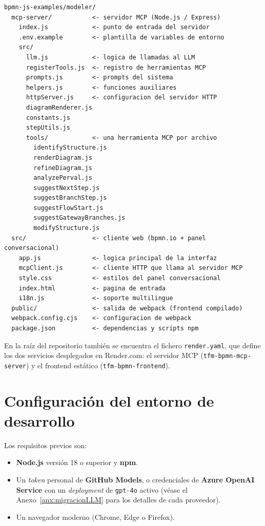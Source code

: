 \begin{lstlisting}[style=promptbox]
bpmn-js-examples/modeler/
  mcp-server/           <- servidor MCP (Node.js / Express)
    index.js            <- punto de entrada del servidor
    .env.example        <- plantilla de variables de entorno
    src/
      llm.js            <- logica de llamadas al LLM
      registerTools.js  <- registro de herramientas MCP
      prompts.js        <- prompts del sistema
      helpers.js        <- funciones auxiliares
      httpServer.js     <- configuracion del servidor HTTP
      diagramRenderer.js
      constants.js
      stepUtils.js
      tools/            <- una herramienta MCP por archivo
        identifyStructure.js
        renderDiagram.js
        refineDiagram.js
        analyzePerval.js
        suggestNextStep.js
        suggestBranchStep.js
        suggestFlowStart.js
        suggestGatewayBranches.js
        modifyStructure.js
  src/                  <- cliente web (bpmn.io + panel conversacional)
    app.js              <- logica principal de la interfaz
    mcpClient.js        <- cliente HTTP que llama al servidor MCP
    style.css           <- estilos del panel conversacional
    index.html          <- pagina de entrada
    i18n.js             <- soporte multilingue
  public/               <- salida de webpack (frontend compilado)
  webpack.config.cjs    <- configuracion de webpack
  package.json          <- dependencias y scripts npm
\end{lstlisting}

En la raíz del repositorio también se encuentra el fichero \texttt{render.yaml}, que define los dos servicios desplegados en Render.com: el servidor MCP (\texttt{tfm-bpmn-mcp-server}) y el frontend estático (\texttt{tfm-bpmn-frontend}).

\section{Configuración del entorno de desarrollo}
\label{sec:anx3-entorno}

Los requisitos previos son:

\begin{itemize}
  \item \textbf{Node.js} versión 18 o superior y \textbf{npm}.
  \item Un \textit{token} personal de \textbf{GitHub Models}, o credenciales de \textbf{Azure OpenAI Service} con un \textit{deployment} de \texttt{gpt-4o} activo (véase el Anexo~\ref{anx:migracionLLM} para los detalles de cada proveedor).
  \item Un navegador moderno (Chrome, Edge o Firefox).
\end{itemize}


